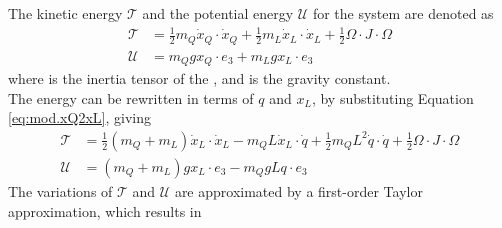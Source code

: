 The kinetic energy $ \mathcal{T} $ and the potential energy $ \mathcal{U} $ for the system are denoted as
\begin{equation}\label{key}
\begin{aligned}
\mathcal{T}&=\frac{1}{2}m_Q\dot{x}_Q\cdot\dot{x}_Q+\frac{1}{2}m_L\dot{x}_L\cdot\dot{x}_L+\frac{1}{2}\Omega \cdot J\cdot\Omega\\
\mathcal{U}&=m_Qgx_Q\cdot e_3+m_Lgx_L\cdot e_3
\end{aligned}
\end{equation}
where  is the inertia tensor of the , and  is the gravity constant.\\
The energy can be rewritten in terms of $ q $ and $ x_L $, by substituting Equation \ref{eq:mod.xQ2xL}, giving
\begin{align}\label{key}
\mathcal{T}&=\frac{1}{2}(m_Q+m_L)\dot{x}_L\cdot\dot{x}_L -m_QL\dot{x}_L\cdot\dot{q} + \frac{1}{2}m_QL^2\dot{q}\cdot\dot{q}+\frac{1}{2}\Omega \cdot J\cdot\Omega\\
\mathcal{U}&=(m_Q+m_L)gx_L\cdot e_3-m_QgLq\cdot e_3
\end{align}
The variations of $ \mathcal{T} $ and $ \mathcal{U} $ are approximated by a first-order Taylor approximation, which results in
